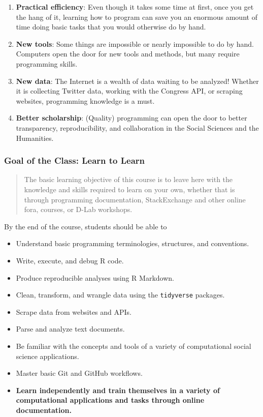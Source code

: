 \documentclass[
]{book}
\providecommand{\tightlist}{%
  \setlength{\itemsep}{0pt}\setlength{\parskip}{0pt}}
\begin{document}
\begin{enumerate}
\def\labelenumi{\arabic{enumi}.}
\item
  \textbf{Practical efficiency}: Even though it takes some time at first, once you get the hang of it, learning how to program can save you an enormous amount of time doing basic tasks that you would otherwise do by hand.
\item
  \textbf{New tools}: Some things are impossible or nearly impossible to do by hand. Computers open the door for new tools and methods, but many require programming skills.
\item
  \textbf{New data}: The Internet is a wealth of data waiting to be analyzed! Whether it is collecting Twitter data, working with the Congress API, or scraping websites, programming knowledge is a must.
\item
  \textbf{Better scholarship}: (Quality) programming can open the door to better transparency, reproducibility, and collaboration in the Social Sciences and the Humanities.
\end{enumerate}

\hypertarget{goal-of-the-class-learn-to-learn}{%
\subsubsection*{Goal of the Class: Learn to Learn}\label{goal-of-the-class-learn-to-learn}}

\begin{quote}
The basic learning objective of this course is to leave here with the
knowledge and skills required to learn on your own, whether that is through
programming documentation, StackExchange and other online fora, courses, or
D-Lab workshops.
\end{quote}

By the end of the course, students should be able to

\begin{itemize}
\tightlist
\item
  Understand basic programming terminologies, structures, and conventions.
\item
  Write, execute, and debug R code.
\item
  Produce reproducible analyses using R Markdown.
\item
  Clean, transform, and wrangle data using the \texttt{tidyverse} packages.
\item
  Scrape data from websites and APIs.
\item
  Parse and analyze text documents.
\item
  Be familiar with the concepts and tools of a variety of computational social science applications.
\item
  Master basic Git and GitHub workflows.
\item
  \textbf{Learn independently and train themselves in a variety of computational applications and tasks through online documentation.}
\end{itemize}
\end{document}
